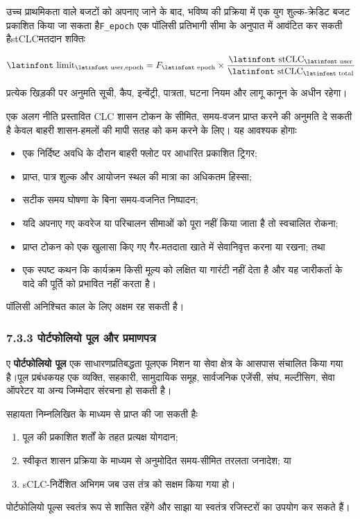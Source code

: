 \documentclass[11pt]{article}
\begin{document}
उच्च प्राथमिकता वाले बजटों को अपनाए जाने के बाद, भविष्य की प्रक्रिया में एक युग शुल्क-क्रेडिट बजट प्रकाशित किया जा सकता है\texttt{F\_epoch} एक पॉलिसी प्रतिभागी सीमा के अनुपात में आवंटित कर सकती हैstCLCमतदान शक्तिः

\[
\text{\latinfont limit}_{\text{\latinfont user,epoch}} = F_{\text{\latinfont epoch}} \times \frac{\text{\latinfont stCLC}_{\text{\latinfont user}}}{\text{\latinfont stCLC}_{\text{\latinfont total}}}
\]

प्रत्येक खिड़की पर अनुमति सूची, कैप, इन्वेंट्री, पात्रता, घटना नियम और लागू कानून के अधीन रहेगा।

एक अलग नीति प्रस्तावित CLC शासन टोकन के सीमित, समय-वजन प्राप्त करने की अनुमति दे सकती है केवल बाहरी शासन-हमलों की मापी सतह को कम करने के लिए। यह आवश्यक होगाः

\begin{itemize}[leftmargin=*]
\item एक निर्दिष्ट अवधि के दौरान बाहरी फ्लोट पर आधारित प्रकाशित ट्रिगर;
\item प्राप्त, पात्र शुल्क और आयोजन स्थल की मात्रा का अधिकतम हिस्सा;
\item सटीक समय घोषणा के बिना समय-वजनित निष्पादन;
\item यदि अपनाए गए कवरेज या परिचालन सीमाओं को पूरा नहीं किया जाता है तो स्वचालित रोकना;
\item प्राप्त टोकन को एक खुलासा किए गए गैर-मतदाता खाते में सेवानिवृत्त करना या रखना; तथा
\item एक स्पष्ट कथन कि कार्यक्रम किसी मूल्य को लक्षित या गारंटी नहीं देता है और यह जारीकर्ता के वादे की पूर्ति को प्रभावित नहीं करता है।
\end{itemize}
पॉलिसी अनिश्चित काल के लिए अक्षम रह सकती है।

\subsubsection*{7.3.3 पोर्टफोलियो पूल और प्रमाणपत्र}

ए \textbf{पोर्टफोलियो पूल} एक साधारणप्रतिबद्धता पूलएक मिशन या सेवा क्षेत्र के आसपास संचालित किया गया है।पूल प्रबंधकयह एक व्यक्ति, सहकारी, सामुदायिक समूह, सार्वजनिक एजेंसी, संघ, मल्टीसिग, सेवा ऑपरेटर या अन्य जिम्मेदार संरचना हो सकती है।

सहायता निम्नलिखित के माध्यम से प्राप्त की जा सकती हैः

\begin{enumerate}[leftmargin=*]
\item पूल की प्रकाशित शर्तों के तहत प्रत्यक्ष योगदान;
\item स्वीकृत शासन प्रक्रिया के माध्यम से अनुमोदित समय-सीमित तरलता जनादेश; या
\item sCLC-निर्देशित अभिगम जब उस तंत्र को सक्षम किया गया हो।
\end{enumerate}
पोर्टफोलियो पूल्स स्वतंत्र रूप से शासित रहेंगे और साझा या स्वतंत्र रजिस्टरों का उपयोग कर सकते हैं।
\end{document}
